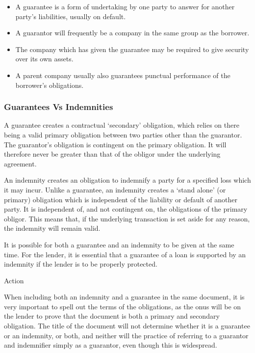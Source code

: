 \documentclass[
]{article}
\providecommand{\tightlist}{%
  \setlength{\itemsep}{0pt}\setlength{\parskip}{0pt}}
\newenvironment{env-0174d31b-3f44-410b-9ae6-7a7b66b1e278}
{
    \savenotes\tcolorbox[blanker,breakable,left=5pt,borderline west={2pt}{-4pt}{aquamarine}]
}
{
    \endtcolorbox\spewnotes
}
\begin{document}
\begin{itemize}
\tightlist
\item
  A guarantee is a form of undertaking by one party to answer for
  another party's liabilities, usually on default.
\item
  A guarantor will frequently be a company in the same group as the
  borrower.
\item
  The company which has given the guarantee may be required to give
  security over its own assets.
\item
  A parent company usually also guarantees punctual performance of the
  borrower's obligations.
\end{itemize}

\hypertarget{guarantees-vs-indemnities}{%
\subsubsection{Guarantees Vs
Indemnities}\label{guarantees-vs-indemnities}}

A guarantee creates a contractual `secondary' obligation, which relies
on there being a valid primary obligation between two parties other than
the guarantor. The guarantor's obligation is contingent on the primary
obligation. It will therefore never be greater than that of the obligor
under the underlying agreement.

An indemnity creates an obligation to indemnify a party for a specified
loss which it may incur. Unlike a guarantee, an indemnity creates a
`stand alone' (or primary) obligation which is independent of the
liability or default of another party. It is independent of, and not
contingent on, the obligations of the primary obligor. This means that,
if the underlying transaction is set aside for any reason, the indemnity
will remain valid.

It is possible for both a guarantee and an indemnity to be given at the
same time. For the lender, it is essential that a guarantee of a loan is
supported by an indemnity if the lender is to be properly protected.

\begin{env-0174d31b-3f44-410b-9ae6-7a7b66b1e278}

Action

When including both an indemnity and a guarantee in the same document,
it is very important to spell out the terms of the obligations, as the
onus will be on the lender to prove that the document is both a primary
and secondary obligation. The title of the document will not determine
whether it is a guarantee or an indemnity, or both, and neither will the
practice of referring to a guarantor and indemnifier simply as a
guarantor, even though this is widespread.

\end{env-0174d31b-3f44-410b-9ae6-7a7b66b1e278}
\end{document}
